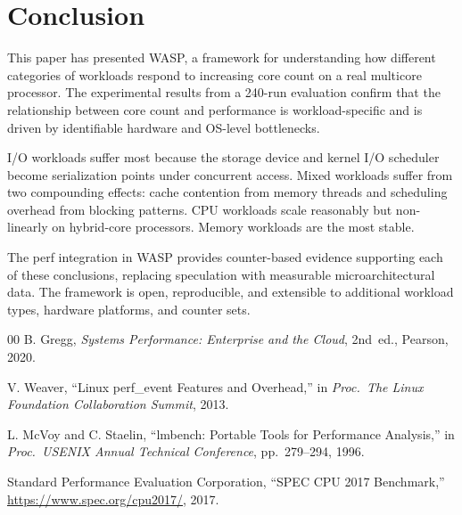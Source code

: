 \documentclass[conference]{IEEEtran}
\begin{document}
\section{Conclusion}
\label{sec:conclusion}

This paper has presented WASP, a framework for understanding how different
categories of workloads respond to increasing core count on a real multicore
processor.  The experimental results from a 240-run evaluation confirm that
the relationship between core count and performance is workload-specific and
is driven by identifiable hardware and OS-level bottlenecks.

I/O workloads suffer most because the storage device and kernel I/O scheduler
become serialization points under concurrent access.  Mixed workloads suffer
from two compounding effects: cache contention from memory threads and
scheduling overhead from blocking patterns.  CPU workloads scale reasonably
but non-linearly on hybrid-core processors.  Memory workloads are the most
stable.

The perf integration in WASP provides counter-based evidence supporting each
of these conclusions, replacing speculation with measurable microarchitectural
data.  The framework is open, reproducible, and extensible to additional
workload types, hardware platforms, and counter sets.

\balance

\begin{thebibliography}{00}
B. Gregg, \emph{Systems Performance: Enterprise and the Cloud}, 2nd~ed.,
Pearson, 2020.

V. Weaver, ``Linux perf\_event Features and Overhead,''
in \emph{Proc.\ The Linux Foundation Collaboration Summit}, 2013.

L. McVoy and C. Staelin, ``lmbench: Portable Tools for Performance Analysis,''
in \emph{Proc.\ USENIX Annual Technical Conference}, pp.~279--294, 1996.

Standard Performance Evaluation Corporation, ``SPEC CPU 2017 Benchmark,''
\url{https://www.spec.org/cpu2017/}, 2017.
\end{thebibliography}
\end{document}
